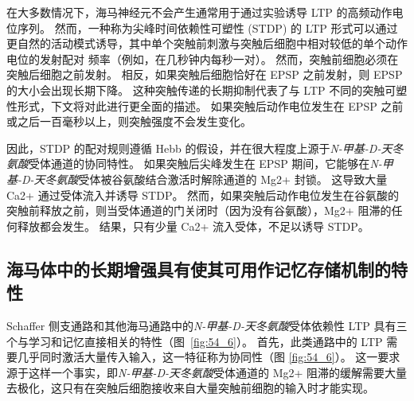 在大多数情况下，海马神经元不会产生通常用于通过实验诱导 LTP 的高频动作电位序列。
然而，一种称为尖峰时间依赖性可塑性 (STDP) 的 LTP 形式可以通过更自然的活动模式诱导，其中单个突触前刺激与突触后细胞中相对较低的单个动作电位的发射配对 频率（例如，在几秒钟内每秒一对）。
然而，突触前细胞必须在突触后细胞之前发射。 相反，如果突触后细胞恰好在 EPSP 之前发射，则 EPSP 的大小会出现长期下降。
这种突触传递的长期抑制代表了与 LTP 不同的突触可塑性形式，下文将对此进行更全面的描述。
如果突触后动作电位发生在 EPSP 之前或之后一百毫秒以上，则突触强度不会发生变化。


因此，STDP 的配对规则遵循 Hebb 的假设，并在很大程度上源于\textit{N-甲基-D-天冬氨酸}受体通道的协同特性。
如果突触后尖峰发生在 EPSP 期间，它能够在\textit{N-甲基-D-天冬氨酸}受体被谷氨酸结合激活时解除通道的 Mg2+ 封锁。
这导致大量 Ca2+ 通过受体流入并诱导 STDP。
然而，如果突触后动作电位发生在谷氨酸的突触前释放之前，则当受体通道的门关闭时（因为没有谷氨酸），Mg2+ 阻滞的任何释放都会发生。
结果，只有少量 Ca2+ 流入受体，不足以诱导 STDP。



\subsection{海马体中的长期增强具有使其可用作记忆存储机制的特性}

Schaffer 侧支通路和其他海马通路中的\textit{N-甲基-D-天冬氨酸}受体依赖性 LTP 具有三个与学习和记忆直接相关的特性（图~\ref{fig:54_6}）。
首先，此类通路中的 LTP 需要几乎同时激活大量传入输入，这一特征称为协同性（图 \ref{fig:54_6}）。
这一要求源于这样一个事实，即\textit{N-甲基-D-天冬氨酸}受体通道的 Mg2+ 阻滞的缓解需要大量去极化，这只有在突触后细胞接收来自大量突触前细胞的输入时才能实现。



